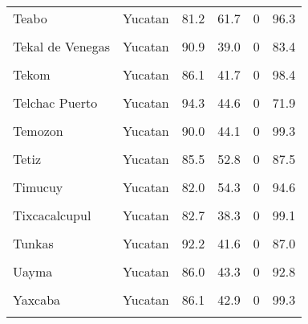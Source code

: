 \documentclass[
]{report}
\begin{document}
\begin{longtable}[t]{llrrrr}
\addlinespace
Teabo & Yucatan & 81.2 & 61.7 & 0 & 96.3\\
\cellcolor{gray!6}{Tecoh} & \cellcolor{gray!6}{Yucatan} & \cellcolor{gray!6}{89.9} & \cellcolor{gray!6}{55.0} & \cellcolor{gray!6}{0} & \cellcolor{gray!6}{91.6}\\
Tekal de Venegas & Yucatan & 90.9 & 39.0 & 0 & 83.4\\
\cellcolor{gray!6}{Tekanto} & \cellcolor{gray!6}{Yucatan} & \cellcolor{gray!6}{91.9} & \cellcolor{gray!6}{47.8} & \cellcolor{gray!6}{0} & \cellcolor{gray!6}{84.9}\\
Tekom & Yucatan & 86.1 & 41.7 & 0 & 98.4\\
\addlinespace
\cellcolor{gray!6}{Telchac Pueblo} & \cellcolor{gray!6}{Yucatan} & \cellcolor{gray!6}{96.2} & \cellcolor{gray!6}{49.4} & \cellcolor{gray!6}{0} & \cellcolor{gray!6}{71.6}\\
Telchac Puerto & Yucatan & 94.3 & 44.6 & 0 & 71.9\\
\cellcolor{gray!6}{Temax} & \cellcolor{gray!6}{Yucatan} & \cellcolor{gray!6}{93.3} & \cellcolor{gray!6}{43.9} & \cellcolor{gray!6}{0} & \cellcolor{gray!6}{70.4}\\
Temozon & Yucatan & 90.0 & 44.1 & 0 & 99.3\\
\cellcolor{gray!6}{Tepakan} & \cellcolor{gray!6}{Yucatan} & \cellcolor{gray!6}{89.3} & \cellcolor{gray!6}{40.4} & \cellcolor{gray!6}{0} & \cellcolor{gray!6}{91.0}\\
\addlinespace
Tetiz & Yucatan & 85.5 & 52.8 & 0 & 87.5\\
\cellcolor{gray!6}{Teya} & \cellcolor{gray!6}{Yucatan} & \cellcolor{gray!6}{92.5} & \cellcolor{gray!6}{42.8} & \cellcolor{gray!6}{0} & \cellcolor{gray!6}{52.0}\\
Timucuy & Yucatan & 82.0 & 54.3 & 0 & 94.6\\
\cellcolor{gray!6}{Tinum} & \cellcolor{gray!6}{Yucatan} & \cellcolor{gray!6}{91.1} & \cellcolor{gray!6}{46.6} & \cellcolor{gray!6}{0} & \cellcolor{gray!6}{96.8}\\
Tixcacalcupul & Yucatan & 82.7 & 38.3 & 0 & 99.1\\
\addlinespace
\cellcolor{gray!6}{Tixmehuac} & \cellcolor{gray!6}{Yucatan} & \cellcolor{gray!6}{83.4} & \cellcolor{gray!6}{43.1} & \cellcolor{gray!6}{0} & \cellcolor{gray!6}{97.8}\\
Tunkas & Yucatan & 92.2 & 41.6 & 0 & 87.0\\
\cellcolor{gray!6}{Tzucacab} & \cellcolor{gray!6}{Yucatan} & \cellcolor{gray!6}{90.1} & \cellcolor{gray!6}{43.3} & \cellcolor{gray!6}{0} & \cellcolor{gray!6}{98.4}\\
Uayma & Yucatan & 86.0 & 43.3 & 0 & 92.8\\
\cellcolor{gray!6}{Xocchel} & \cellcolor{gray!6}{Yucatan} & \cellcolor{gray!6}{91.8} & \cellcolor{gray!6}{46.1} & \cellcolor{gray!6}{0} & \cellcolor{gray!6}{87.7}\\
\addlinespace
Yaxcaba & Yucatan & 86.1 & 42.9 & 0 & 99.3\\
\cellcolor{gray!6}{Yobain} & \cellcolor{gray!6}{Yucatan} & \cellcolor{gray!6}{97.1} & \cellcolor{gray!6}{44.1} & \cellcolor{gray!6}{0} & \cellcolor{gray!6}{60.4}\\*
\end{longtable}
\end{document}
